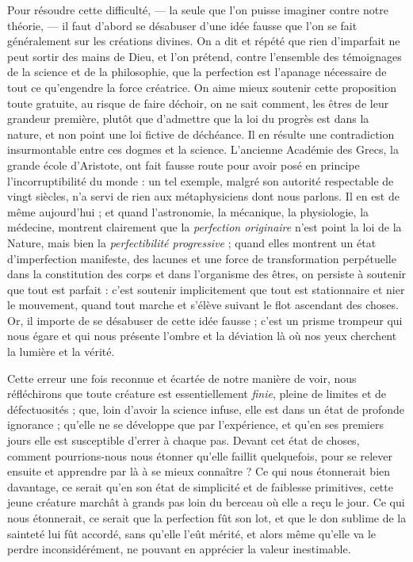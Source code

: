 \documentclass[a4paper, 11pt, oneside, landscape]{article}
\begin{document}
Pour résoudre cette difficulté, --- la seule que l'on puisse imaginer contre notre théorie, --- il faut d'abord se désabuser d'une idée fausse que l'on se fait généralement sur les créations divines. On a dit et répété que rien d'imparfait ne peut sortir des mains de Dieu, et l'on prétend, contre l'ensemble des témoignages de la science et de la philosophie, que la perfection est l'apanage nécessaire de tout ce qu'engendre la force créatrice. On aime mieux soutenir cette proposition toute gratuite, au risque de faire déchoir, on ne sait comment, les êtres de leur grandeur première, plutôt que d'admettre que la loi du progrès est dans la nature, et non point une loi fictive de déchéance. Il en résulte une contradiction insurmontable entre ces dogmes et la science. L'ancienne Académie des Grecs, la grande école d'Aristote, ont fait fausse route pour avoir posé en principe l'incorruptibilité du monde : un tel exemple, malgré son autorité respectable de vingt siècles, n'a servi de rien aux métaphysiciens dont nous parlons. Il en est de même aujourd'hui ; et quand l'astronomie, la mécanique, la physiologie, la médecine, montrent clairement que la \emph{perfection originaire} n'est point la loi de la Nature, mais bien la \emph{perfectibilité progressive} ; quand elles montrent un état d'imperfection manifeste, des lacunes et une force de transformation perpétuelle dans la constitution des corps et dans l'organisme des êtres, on persiste à soutenir que tout est parfait : c'est soutenir implicitement que tout est stationnaire et nier le mouvement, quand tout marche et s'élève suivant le flot ascendant des choses. Or, il importe de se désabuser de cette idée fausse ; c'est un prisme trompeur qui nous égare et qui nous présente l'ombre et la déviation là où nos yeux cherchent la lumière et la vérité.

Cette erreur une fois reconnue et écartée de notre manière de voir, nous réfléchirons que toute créature est essentiellement \emph{finie}, pleine de limites et de défectuosités ; que, loin d'avoir la science infuse, elle est dans un état de profonde ignorance ; qu'elle ne se développe que par l'expérience, et qu'en ses premiers jours elle est susceptible d'errer à chaque pas. Devant cet état de choses, comment pourrions-nous nous étonner qu'elle faillit quelquefois, pour se relever ensuite et apprendre par là à se mieux connaître ? Ce qui nous étonnerait bien davantage, ce serait qu'en son état de simplicité et de faiblesse primitives, cette jeune créature marchât à grands pas loin du berceau où elle a reçu le jour. Ce qui nous étonnerait, ce serait que la perfection fût son lot, et que le don sublime de la sainteté lui fût accordé, sans qu'elle l'eût mérité, et alors même qu'elle va le perdre inconsidérément, ne pouvant en apprécier la valeur inestimable.
\end{document}
